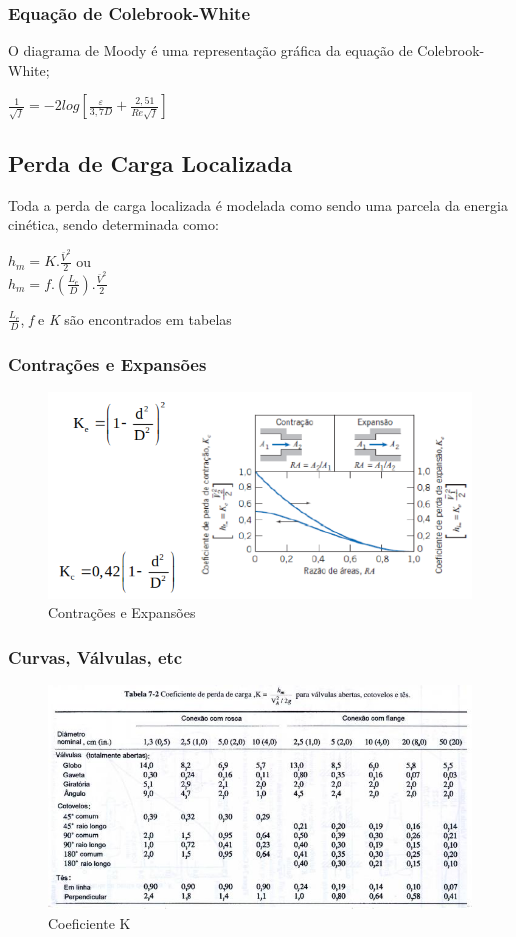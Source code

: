 \documentclass[a4paper, 12pt]{article}
\begin{document}
\subsubsection{Equação de Colebrook-White}
	O diagrama de Moody é uma representação gráfica da equação de Colebrook-White;
	\begin{center}
		$
		\frac{1}{\sqrt{f}} = -2 log[\frac{\varepsilon}{3,7D}+\frac{2,51}{Re\sqrt{f}}]
		$
	\end{center}

\newpage
\subsection{Perda de Carga Localizada}
	Toda a perda de carga localizada é modelada como sendo uma parcela da energia cinética, sendo determinada como:
	\begin{center}
		\Large
		$
		h_{m} = K.\frac{\bar{V}^2}{2}
		$ ou\\
		$
		h_{m} = f.(\frac{L_{e}}{D}).\frac{\bar{V}^2}{2}
		$
	\end{center}
	\textit{$\frac{L_{e}}{D}$}, \textit{f} e \textit{K} são encontrados em tabelas
	
\subsubsection{Contrações e Expansões}
	\begin{figure}[h]
		\centering
		\includegraphics[width=0.7\linewidth]{imagens/cargaloc}
		\caption{Contrações e Expansões}
		\label{fig:cargaloc}
	\end{figure}

\subsubsection{Curvas, Válvulas, etc}
	\begin{figure}[h]
		\centering
		\includegraphics[width=0.9\linewidth]{imagens/valv}
		\caption{Coeficiente K}
		\label{fig:valv}
	\end{figure}
\end{document}
